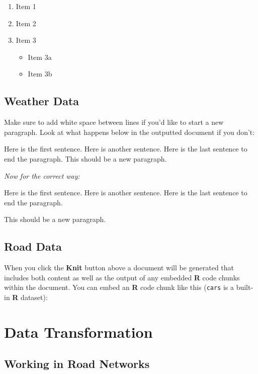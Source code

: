 \documentclass[12pt,twoside]{reedthesis}
\begin{document}
  \begin{enumerate}
  \def\labelenumi{\arabic{enumi}.}
  \itemsep1pt\parskip0pt
  \item
    Item 1
  \item
    Item 2
  \item
    Item 3
  
    \begin{itemize}
    \itemsep1pt\parskip0pt
    \item
      Item 3a
    \item
      Item 3b
    \end{itemize}
  \end{enumerate}
  
  \section{Weather Data}\label{weather-data}
  
  Make sure to add white space between lines if you'd like to start a new
  paragraph. Look at what happens below in the outputted document if you
  don't:
  
  Here is the first sentence. Here is another sentence. Here is the last
  sentence to end the paragraph. This should be a new paragraph.
  
  \emph{Now for the correct way:}
  
  Here is the first sentence. Here is another sentence. Here is the last
  sentence to end the paragraph.
  
  This should be a new paragraph.
  
  \section{Road Data}\label{road-data}
  
  When you click the \textbf{Knit} button above a document will be
  generated that includes both content as well as the output of any
  embedded \textbf{R} code chunks within the document. You can embed an
  \textbf{R} code chunk like this (\texttt{cars} is a built-in \textbf{R}
  dataset):
  
  \chapter{Data Transformation}\label{data-trans}
  
  \section{Working in Road Networks}\label{working-in-road-networks}
  
\end{document}
